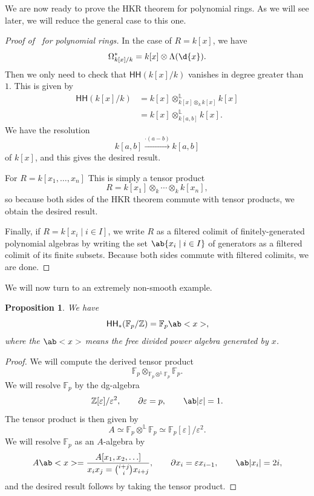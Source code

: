 \documentclass[10pt, oneside]{memoir}
\newtheorem{prop}[thm]{Proposition}
\theoremstyle{definition}
\theoremstyle{remark}
\theoremstyle{plain}
\theoremstyle{definition}
\theoremstyle{remark}
\newcommand{\Z}{\mathbb{Z}}
\newcommand{\F}{\mathbb{F}}
\renewcommand{\L}{\mathbb{L}}
\newcommand{\ep}{\varepsilon}
\newcommand{\ms}[1]{\mathsf{#1}}
\newcommand{\1}{\mathbf{1}}
\newcommand{\2}{\mathbf{2}}
\newcommand{\3}{\mathbf{3}}
\newcommand{\HH}{\ms{HH}}
\begin{document}
We are now ready to prove the HKR theorem for polynomial rings. As we will see later, we will reduce the general case to this one.
\begin{proof}[Proof of~ for polynomial rings]
    In the case of \(R = k[x] \), we have
    \[ \Omega^*_{k[x]/k} = k[x] \otimes \Lambda(\d{x}). \]
    Then we only need to check that \(\HH(k[x]/k) \) vanishes in degree greater than \(1 \). This is given by
    \begin{align*}
        \HH(k[x]/k) &= k[x] \otimes^{\L}_{k[x] \otimes_k k[x]} k[x] \\
        &= k[x] \otimes_{k[a,b]}^{\L} k[x].
    \end{align*}
    We have the resolution
    \[ k[a,b] \xrightarrow{\cdot (a-b)} k[a,b] \]
    of \(k[x] \), and this gives the desired result.

    For \(R = k[x_1, \ldots, x_n] \) This is simply a tensor product
    \[ R = k[x_1] \otimes_k \cdots \otimes_k k[x_n], \]
    so because both sides of the HKR theorem commute with tensor products, we obtain the desired result.

    Finally, if \(R = k[x_i \mid i \in I] \), we write \(R \) as a filtered colimit of finitely-generated polynomial algebras by writing the set \(\ab\{x_i \mid i \in I\} \) of generators as a filtered colimit of its finite subsets. Because both sides commute with filtered colimits, we are done.
\end{proof}

We will now turn to an extremely non-smooth example.
\begin{prop}
    We have
    \[ \HH_*(\F_p/\Z) = \F_p \ab<x>, \]
    where the \(\ab<x> \) means the free divided power algebra generated by \(x \).
\end{prop}

\begin{proof}
    We will compute the derived tensor product
    \[ \F_p \otimes_{\F_p \otimes^{\L} \F_p} \F_p. \]
    We will resolve \(\F_p \) by the dg-algebra
    \[ \Z[\ep]/\ep^2, \qquad \partial \ep = p, \qquad \ab|\ep| = 1. \]
    The tensor product is then given by
    \[ A \simeq \F_p \otimes^{\L} \F_p \simeq \F_p[\ep]/\ep^2. \]
    We will resolve \(\F_p \) as an \(A \)-algebra by
    \[ A\ab<x> = \frac{A[x_1, x_2, \ldots]}{x_ix_j = \binom{i+j}{i} x_{i+j}}, \qquad \partial x_i = \ep x_{i-1}, \qquad \ab|x_i| = 2i, \]
    and the desired result follows by taking the tensor product.
\end{proof}
\end{document}
